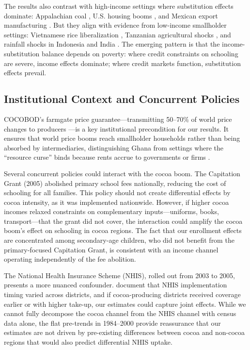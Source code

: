 \documentclass[12pt]{article}
\begin{document}
The results also contrast with high-income settings where substitution effects dominate: Appalachian coal \citep{black2005}, U.S. housing booms \citep{charles2018}, and Mexican export manufacturing \citep{atkin2016}. But they align with evidence from low-income smallholder settings: Vietnamese rice liberalization \citep{edmonds2005}, Tanzanian agricultural shocks \citep{beegle2006}, and rainfall shocks in Indonesia \citep{maccini2009} and India \citep{shah2017}. The emerging pattern is that the income-substitution balance depends on poverty: where credit constraints on schooling are severe, income effects dominate; where credit markets function, substitution effects prevail.

\subsection{Institutional Context and Concurrent Policies}

COCOBOD's farmgate price guarantee---transmitting 50--70\% of world price changes to producers \citep{kolavalli2011}---is a key institutional precondition for our results. It ensures that world price booms reach smallholder households rather than being absorbed by intermediaries, distinguishing Ghana from settings where the ``resource curse'' binds because rents accrue to governments or firms \citep{sachs2001}.

Several concurrent policies could interact with the cocoa boom. The Capitation Grant (2005) abolished primary school fees nationally, reducing the cost of schooling for all families. This policy should not create differential effects by cocoa intensity, as it was implemented nationwide. However, if higher cocoa incomes relaxed constraints on complementary inputs---uniforms, books, transport---that the grant did not cover, the interaction could amplify the cocoa boom's effect on schooling in cocoa regions. The fact that our enrollment effects are concentrated among secondary-age children, who did not benefit from the primary-focused Capitation Grant, is consistent with an income channel operating independently of the fee abolition.

The National Health Insurance Scheme (NHIS), rolled out from 2003 to 2005, presents a more nuanced confounder. \citet{garcia2021} document that NHIS implementation timing varied across districts, and if cocoa-producing districts received coverage earlier or with higher take-up, our estimates could capture joint effects. While we cannot fully decompose the cocoa channel from the NHIS channel with census data alone, the flat pre-trends in 1984--2000 provide reassurance that our estimates are not driven by pre-existing differences between cocoa and non-cocoa regions that would also predict differential NHIS uptake.
\end{document}
